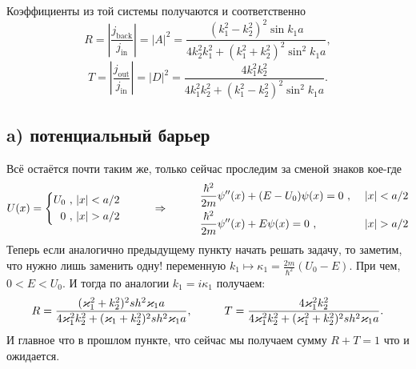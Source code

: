 Коэффициенты из той системы получаются и соответственно 
\begin{equation*}
	R = \left| \frac{j_\text{back}}{j_\text{in}}\right| 
	= 
	|A|^2 
	= 
	\frac{(k_1^2 - k_2^2)^2 \sin k_1 a}{4 k_2^2 k_1^2 + (k_1^2 + k_2^2)^2 \sin^2 k_1 a},
\end{equation*}
\begin{equation*}
	T = \left| \frac{j_\text{out}}{j_\text{in}}\right|
	=
	|D|^2
	=
	\frac{4 k_1^2 k_2^2}{4 k_1^2 k_2^2 + (k_1^2 - k_2^2)^2 \sin^2 k_1 a}.
\end{equation*}

\subsection*{a) потенциальный барьер}
Всё остаётся почти таким же, только сейчас проследим за сменой знаков кое-где
\begin{equation*}
	U(x) = \left\{\begin{aligned}
		U_0 \ , \ &|x| < a/2\\
		0\ , \ &|x|>a/2
	\end{aligned}\right.
	\hspace{1 cm}
	\Rightarrow
	\hspace{1 cm}
	\begin{aligned}
		&\frac{\hbar^2}{2m} \psi''(x) + ( E - U_0) \psi(x) = 0 \ , \ &|x| < a/2\\
		&\frac{\hbar^2}{2m} \psi''(x) + E \psi(x) = 0 \ , \ &|x|>a/2
	\end{aligned}
\end{equation*}
Теперь если аналогично предыдущему пункту начать решать задачу, то заметим, что нужно лишь заменить одну! переменную $k_1 \mapsto \kappa_1 = \frac{2 m}{\hbar^2}(U_0 - E)$. При чем, $0 < E < U_0$. И тогда по аналогии $k_1 = i \kappa_1$ получаем:
\begin{equation*}
	R = \frac{(\kappa_1^2 + k_2^2)^2 sh^2 \kappa_1 a}{4 \kappa_1^2 k_2^2 + (\kappa_1 + k_2^2)^2 sh^2 \kappa_1 a},
	\hspace{1 cm}
	T = \frac{4 \kappa_1^2 k_2^2}{4 \kappa_1^2 k_2^2 + (\kappa_1^2 + k_2^2)^2 sh^2 \kappa_1 a}.
\end{equation*}
И главное что в прошлом пункте, что сейчас мы получаем сумму $R + T = 1$ что и ожидается.